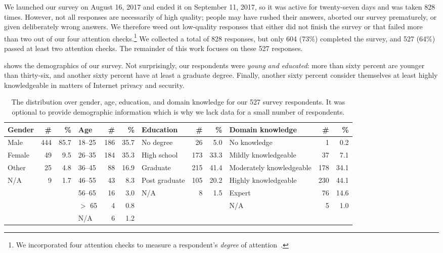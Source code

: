 We launched our survey on August 16, 2017 and ended it on September 11, 2017, so
it was active for twenty-seven days and was taken 828 times.  However, not all
responses are necessarily of high quality; people may have rushed their answers,
aborted our survey prematurely, or given deliberately wrong answers.  We
therefore weed out low-quality responses that either did not finish the survey
or that failed more than two out of our four attention checks.\footnote{We
incorporated four attention checks to measure a respondent's \emph{degree} of
attention~\cite{Berinsky2014a}.} We collected a total of 828 responses, but only
604 (73\%) completed the survey, and 527 (64\%) passed at least two attention
checks.  The remainder of this work focuses on these 527 responses.

 shows the demographics of our survey.  Not
surprisingly, our respondents were \emph{young and educated}: more than sixty
percent are younger than thirty-six, and another sixty percent have at least a
graduate degree.  Finally, another sixty percent consider themselves at least
highly knowledgeable in matters of Internet privacy and security.

\begin{table*}[t]
	\centering
	\caption{The distribution over gender, age, education, and domain knowledge
	for our 527 survey respondents.  It was optional to provide demographic
	information which is why we lack data for a small number of respondents.}
	\label{tab:survey-demo}
	\begin{tabular}{l r r | l r r | l r r | l r r}
	\toprule
	Gender & \# & \% &
	Age & \# & \% &
	Education & \# & \% &
	Domain knowledge & \# & \% \\
	\midrule
	Male   & 444 & 85.7 & 18--25 & 186 & 35.7 & No degree     &  26 & 5.0  & No knowledge             &   1 & 0.2  \\
	Female &  49 &  9.5 & 26--35 & 184 & 35.3 & High school   & 173 & 33.3 & Mildly knowledgeable     &  37 & 7.1  \\
	Other  &  25 &  4.8 & 36--45 &  88 & 16.9 & Graduate      & 215 & 41.4 & Moderately knowledgeable & 178 & 34.1 \\
	N/A    &   9 &  1.7 & 46--55 &  43 &  8.3 & Post graduate & 105 & 20.2 & Highly knowledgeable     & 230 & 44.1 \\
	       &     &      & 56--65 &  16 &  3.0 & N/A           &   8 &  1.5 & Expert                   &  76 & 14.6 \\
	       &     &      & $>$ 65 &   4 &  0.8 &               &     &      & N/A                      &   5 &  1.0 \\
	       &     &      & N/A    &   6 &  1.2 &               &     &      &                          &     & \\
	\bottomrule
	\end{tabular}
\end{table*}
